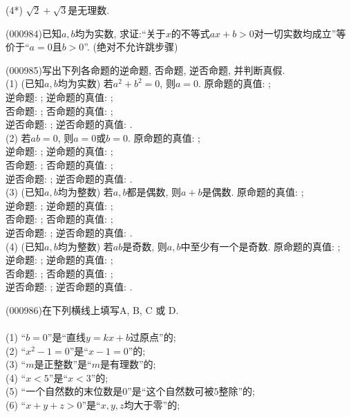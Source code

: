 (4*) $\sqrt{2}+\sqrt{3}$是无理数.
\item (000984)已知$a,b$均为实数, 求证:``关于$x$的不等式$ax+b>0$对一切实数均成立''等价于``$a=0$且$b>0$''. (绝对不允许跳步骤)
\item (000985)写出下列各命题的逆命题, 否命题, 逆否命题, 并判断真假.\\ 
(1) (已知$a,b$均为实数) 若$a^2+b^2=0$, 则$a=0$. 原命题的真值: ;\\ 
逆命题: ; 逆命题的真值: ;\\ 
否命题: ; 否命题的真值: ;\\ 
逆否命题: ; 逆否命题的真值: .\\ 
(2) 若$ab=0$, 则$a=0$或$b=0$. 原命题的真值: ;\\ 
逆命题: ; 逆命题的真值: ;\\ 
否命题: ; 否命题的真值: ;\\ 
逆否命题: ; 逆否命题的真值: .\\ 
(3) (已知$a,b$均为整数) 若$a,b$都是偶数, 则$a+b$是偶数. 原命题的真值: ;\\ 
逆命题: ; 逆命题的真值: ;\\ 
否命题: ; 否命题的真值: ;\\ 
逆否命题: ; 逆否命题的真值: .\\ 
(4) (已知$a,b$均为整数) 若$ab$是奇数, 则$a,b$中至少有一个是奇数. 原命题的真值: ;\\ 
逆命题: ; 逆命题的真值: ;\\ 
否命题: ; 否命题的真值: ;\\ 
逆否命题: ; 逆否命题的真值: .
\item (000986)在下列横线上填写A, B, C 或 D. \\ 
\\ 
(1) ``$b=0$''是``直线$y=kx+b$过原点''的;\\ 
(2) ``$x^2-1=0$''是``$x-1=0$''的;\\ 
(3) ``$m$是正整数''是``$m$是有理数''的;\\ 
(4) ``$x<5$''是``$x<3$''的;\\ 
(5) ``一个自然数的末位数是$0$''是``这个自然数可被$5$整除''的;\\ 
(6) ``$x+y+z>0$''是``$x,y,z$均大于零''的;\\ 
